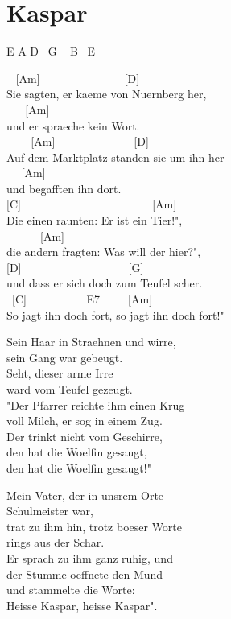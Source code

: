 \documentclass[
  letterpaper,
]{scrbook}
\begin{document}
\hypertarget{kaspar}{%
\chapter{Kaspar}\label{kaspar}}

E A D ~G ~ B ~E

~ {[}Am{]} ~ ~ ~ ~ ~ ~ ~ ~ ~{[}D{]}\\
Sie sagten, er kaeme von Nuernberg her,\\
\hspace*{0.333em} ~ ~ {[}Am{]}\\
und er spraeche kein Wort.\\
\hspace*{0.333em} ~ ~ ~{[}Am{]} ~ ~ ~ ~ ~ ~ ~ ~ {[}D{]} ~\\
Auf dem Marktplatz standen sie um ihn her\\
\hspace*{0.333em} ~ ~{[}Am{]}\\
und begafften ihn dort.\\
\hspace*{0.333em} {[}C{]} ~ ~ ~ ~ ~ ~ ~ ~ ~ ~ ~ ~ ~ ~{[}Am{]}\\
Die einen raunten: Er ist ein Tier!", ~\\
\hspace*{0.333em} ~ ~ ~ ~{[}Am{]}\\
die andern fragten: Was will der hier?",\\
{[}D{]} ~ ~ ~ ~ ~ ~ ~ ~ ~ ~ ~ {[}G{]}\\
und dass er sich doch zum Teufel scher\textquotesingle.\\
\hspace*{0.333em} ~{[}C{]} ~ ~ ~ ~ ~ ~ E7 ~ ~ ~{[}Am{]}\\
So jagt ihn doch fort, so jagt ihn doch fort!"

Sein Haar in Straehnen und wirre,\\
sein Gang war gebeugt.\\
Seht, dieser arme Irre\\
ward vom Teufel gezeugt.\\
"Der Pfarrer reichte ihm einen Krug\\
voll Milch, er sog in einem Zug.\\
Der trinkt nicht vom Geschirre,\\
den hat die Woelfin gesaugt,\\
den hat die Woelfin gesaugt!"

Mein Vater, der in uns\textquotesingle rem Orte\\
Schulmeister war,\\
trat zu ihm hin, trotz boeser Worte\\
rings aus der Schar.\\
Er sprach zu ihm ganz ruhig, und\\
der Stumme oeffnete den Mund\\
und stammelte die Worte:\\
Heisse Kaspar, heisse Kaspar".
\end{document}
